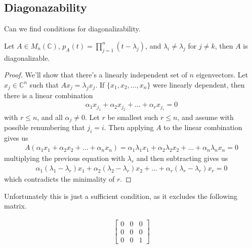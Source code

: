 

\subsection{Diagonazability}

Can we find conditions for diagonalizability.

\begin{theorem}
  Let $A \in M_n(\mathbb{C})$, $p_A(t) = \prod_{j = 1}^{n} (t -
  \lambda_j)$, and $\lambda_i \neq \lambda_j$ for $j \neq k$, then
  $A$ is diagonalizable.
\end{theorem}
\begin{proof}
  We'll show that there's a linearly independent set of $n$
  eigenvectors. Let $x_j \in \mathbb{C}^n$ such that $Ax_j =
  \lambda_j x_j$. If $\{x_1 , x_2 , \ldots , x_n  \}$ were linearly
  dependent, then there is a linear combination
  \begin{align*}
    \alpha_1x_{j_1} + \alpha_2x_{j_2} + \ldots + \alpha_rx_{j_r} = 0
  \end{align*}
  with $ r \le n$, and all $\alpha_j \neq 0$. Let $r$ be smallest
  such $r \le n$, and assume with possible renumbering that $j_i =
  i$. Then applying $ A$ to the linear combination gives us
  \begin{align*}
    A( \alpha_1x_{1} + \alpha_2x_{2} + \ldots + \alpha_nx_{n})
    =\alpha_1 \lambda_1 x_{1} + \alpha_2 \lambda_2 x_{2} + \ldots +
    \alpha_n \lambda_n x_{n}  = 0
  \end{align*}
  multiplying the previous equation with $\lambda_r$ and then
  subtracting gives us
  \begin{align*}
    \alpha_1 (\lambda_1 - \lambda_r) x_{1} + \alpha_2 (\lambda_2 -
    \lambda_r) x_{2} + \ldots + \alpha_r (\lambda_r - \lambda_r) x_{r}  = 0
  \end{align*}
  which contradicts the minimality of $r$.
\end{proof}

Unfortunately this is just a sufficient condition, as it excludes the
following matrix.

\begin{align*}
  \begin{bmatrix}%
    0 & 0 & 0\\
    0 & 0 & 0\\
    0 & 0 & 1
  \end{bmatrix}
\end{align*}

